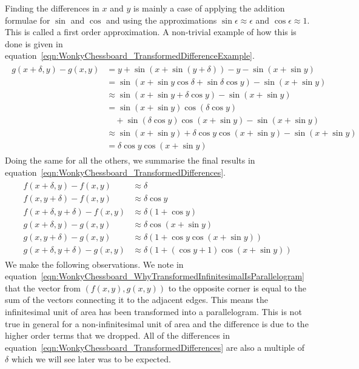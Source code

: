 \begin{parts}
\begin{solution}
		Finding the differences in $x$ and $y$ is mainly a case of applying the addition formulae for $\sin$ and $\cos$ and using the approximations $\sin\epsilon \approx \epsilon$ and $\cos\epsilon \approx 1$. This is called a first order approximation. A non-trivial example of how this is done is given in equation~\eqref{eqn:WonkyChessboard_TransformedDifferenceExample}.
		\begin{align}
			\begin{split}
				g(x + \delta, y) - g(x, y) &= y + \sin(x + \sin(y + \delta)) - y - \sin(x + \sin y)  \\
				&= \sin(x + \sin y \cos\delta + \sin\delta \cos y) - \sin(x + \sin y)  \\
				&\approx \sin(x + \sin y + \delta \cos y) - \sin(x + \sin y)  \\
				&= \sin(x + \sin y)\cos(\delta\cos y) \\
				&\quad + \sin(\delta\cos y)\cos(x + \sin y)
				- \sin(x + \sin y) \\
				&\approx \sin(x + \sin y) + \delta \cos y \cos(x + \sin y) - \sin(x + \sin y)  \\
				&= \delta \cos y \cos(x + \sin y)
			\end{split}\label{eqn:WonkyChessboard_TransformedDifferenceExample}
		\end{align}
		Doing the same for all the others, we summarise the final results in equation~\eqref{eqn:WonkyChessboard_TransformedDifferences}.
		\begin{align}
			\begin{split}
				f(x + \delta, y) - f(x, y) &\approx \delta  \\
				f(x, y + \delta) - f(x, y) &\approx \delta \cos y  \\
				f(x + \delta, y + \delta) - f(x, y) &\approx \delta(1 + \cos y)  \\
				g(x + \delta, y) - g(x, y) &\approx \delta \cos(x + \sin y)  \\
				g(x, y + \delta) - g(x, y) &\approx \delta (1 + \cos y \cos(x + \sin y))  \\
				g(x + \delta, y + \delta) - g(x, y) &\approx \delta (1 + (\cos y + 1)\cos(x + \sin y))
			\end{split}\label{eqn:WonkyChessboard_TransformedDifferences}
		\end{align}
		We make the following observations. We note in equation~\eqref{eqn:WonkyChessboard_WhyTransformedInfinitesimalIsParallelogram} that the vector from $(f(x, y), g(x, y))$ to the opposite corner is equal to the sum of the vectors connecting it to the adjacent edges. This means the infinitesimal unit of area has been transformed into a parallelogram. This is not true in general for a non-infinitesimal unit of area and the difference is due to the higher order terms that we dropped. All of the differences in equation~\eqref{eqn:WonkyChessboard_TransformedDifferences} are also a multiple of $\delta$ which we will see later was to be expected.

\end{solution}
\end{parts}
